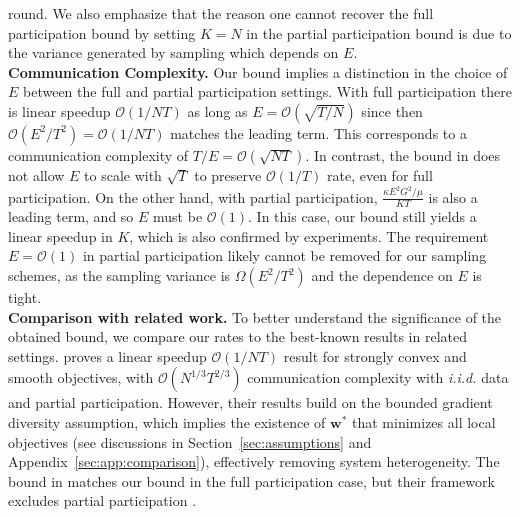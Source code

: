 round. We also emphasize that the reason one cannot recover the full participation bound by setting $K=N$ in the partial participation bound is due to the variance generated by sampling which depends on $E$.  \\
\textbf{Communication Complexity.} Our bound implies a distinction
in the choice of $E$ between the full and partial participation settings.
With full participation there is linear speedup $\mathcal{O}(1/NT)$
as long as $E=\mathcal{O}(\sqrt{T/N})$ since then $\mathcal{O}(E^{2}/T^{2})=\mathcal{O}(1/NT)$
matches the leading term. This corresponds to a communication complexity
of $T/E=\mathcal{O}(\sqrt{NT})$. In contrast, the bound in \cite{li2019convergence}
does not allow $E$ to scale with $\sqrt{T}$ to preserve $\mathcal{O}(1/T)$
rate, even for full participation. On the other hand, with partial
participation, $\frac{\kappa E^{2}G^{2}/\mu}{KT}$ is also a leading
term, and so $E$ must be $\mathcal{O}(1)$. In this case, our bound
still yields a linear speedup in $K$, which is also confirmed by
experiments. The requirement $E=\mathcal{O}(1)$ in partial participation
likely cannot be removed for our sampling schemes, as the sampling
variance is $\Omega(E^{2}/T^{2})$ and the dependence on $E$ is tight.  \\
\textbf{Comparison with related work.} To better understand the significance of the obtained bound, we compare our rates to the best-known results in related settings. \cite{haddadpour2019convergence} proves a linear speedup $\mathcal{O}(1/NT)$ result for strongly convex and smooth objectives, with $\mathcal{O}(N^{1/3}T^{2/3})$ communication complexity with \emph{i.i.d.} data and partial participation. However, their results build on the bounded gradient diversity assumption, which implies the existence of $\mathbf{w}^*$ that minimizes all local objectives (see discussions in Section~\ref{sec:assumptions} and Appendix~\ref{sec:app:comparison}), effectively removing system heterogeneity. The bound in \cite{koloskova2020unified} matches our bound in the full participation case, but their framework excludes partial participation \cite[Proposition 1]{koloskova2020unified}.

\begin{comment}
	In this overparameterized setting, we prove a geometric convergence rate (see Section~\ref{sec:overparameterized}), 
	thus improving on the rate in \cite{haddadpour2019convergence} with
	better communication complexity. 
\end{comment}

